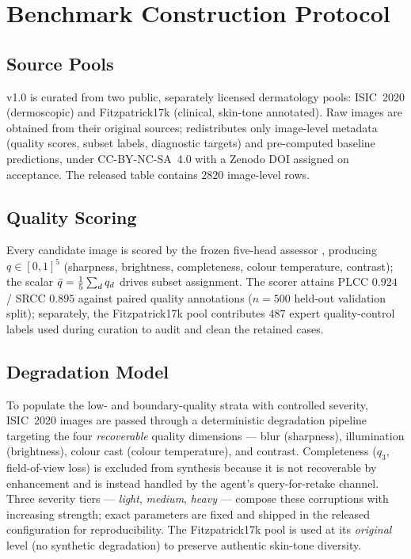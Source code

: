 
\section{\itb{} Benchmark Construction Protocol}\label{app:a4}

\subsection{Source Pools}\label{app:a4-source}
\itb v1.0 is curated from two public, separately licensed dermatology pools: ISIC~2020
(dermoscopic) and Fitzpatrick17k (clinical, skin-tone annotated). Raw images are obtained from their
original sources; \itb redistributes only image-level metadata (quality scores, subset labels,
diagnostic targets) and pre-computed baseline predictions, under CC-BY-NC-SA~4.0 with a Zenodo DOI
assigned on acceptance. The released table contains $2820$ image-level rows.

\subsection{Quality Scoring}\label{app:a4-scoring}
Every candidate image is scored by the frozen five-head assessor \visiscore, producing
$q\in[0,1]^5$ (sharpness, brightness, completeness, colour temperature, contrast); the scalar
$\bar{q}=\tfrac{1}{5}\sum_d q_d$ drives subset assignment. The scorer attains PLCC $0.924$ / SRCC
$0.895$ against paired quality annotations ($n{=}500$ held-out validation split); separately, the
Fitzpatrick17k pool contributes $487$ expert quality-control labels used during curation to audit and
clean the retained cases.

\subsection{Degradation Model}\label{app:a4-degrade}
To populate the low- and boundary-quality strata with controlled severity, ISIC~2020 images are
passed through a deterministic degradation pipeline targeting the four \emph{recoverable} quality
dimensions --- blur (sharpness), illumination (brightness), colour cast (colour temperature), and
contrast. Completeness ($q_3$, field-of-view loss) is excluded from synthesis because it is not
recoverable by enhancement and is instead handled by the agent's query-for-retake channel. Three
severity tiers --- \emph{light}, \emph{medium}, \emph{heavy} --- compose these corruptions with
increasing strength; exact parameters are fixed and shipped in the released configuration for
reproducibility. The Fitzpatrick17k pool is used at its \emph{original} level (no synthetic
degradation) to preserve authentic skin-tone diversity.

